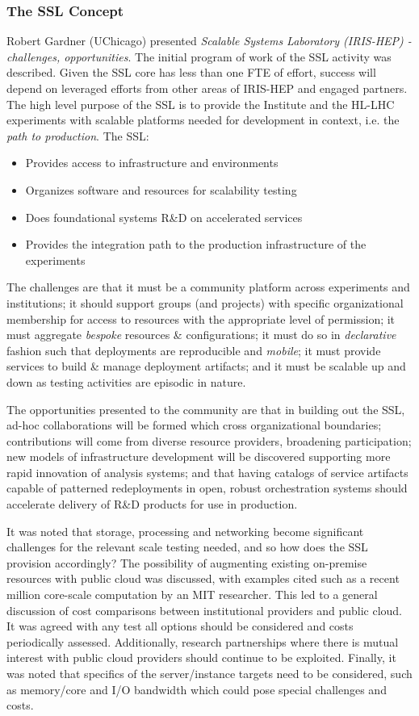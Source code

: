 \documentclass[11pt,letterpaper,fleqn]{article}
\begin{document}
\subsubsection{The SSL Concept}
Robert Gardner (UChicago) presented {\it Scalable Systems Laboratory (IRIS-HEP) - challenges, opportunities}.  The initial program of work of the SSL activity was described.  Given the SSL core has less than one FTE of effort, success will depend on leveraged efforts from other areas of IRIS-HEP and engaged partners. The high level purpose of the SSL is to provide the Institute and the HL-LHC experiments with scalable platforms needed for development in context, i.e. the {\it path to production}. The SSL:

\begin{itemize}
  \item Provides access to infrastructure and environments
  \item Organizes software and resources for scalability testing
  \item Does foundational systems R\&D on accelerated services
  \item Provides the integration path to the production infrastructure of the experiments
\end{itemize}

The challenges are that it must be a community platform across experiments and institutions; it should support groups (and projects) with specific organizational membership for access to resources with the appropriate level of permission; it must aggregate {\it bespoke} resources \& configurations; it must do so in {\it declarative} fashion such that deployments are reproducible and {\it mobile}; it must provide services to build \& manage deployment artifacts; and it must be scalable up and down as testing activities are episodic in nature.

The opportunities presented to the community are that in building out the SSL, ad-hoc collaborations will be formed which cross organizational boundaries; contributions will come from diverse resource providers, broadening participation; new models of infrastructure development will be discovered supporting more rapid innovation of analysis systems; and that having catalogs of service artifacts capable of patterned redeployments in open, robust orchestration systems should accelerate delivery of R\&D products for use in production.

It was noted that storage, processing and networking become significant challenges for the relevant scale testing needed, and so how does the SSL provision accordingly? The possibility of augmenting existing on-premise resources with public cloud was discussed, with examples cited such as a recent million core-scale computation by an MIT researcher.  This led to a general discussion of cost comparisons between institutional providers and public cloud. It was agreed with any test all options should be considered and costs periodically assessed.  Additionally, research partnerships where there is mutual interest with public cloud providers should continue to be exploited.  Finally, it was noted that specifics of the server/instance targets need to be considered, such as memory/core and I/O bandwidth which could pose special challenges and costs.
\end{document}
